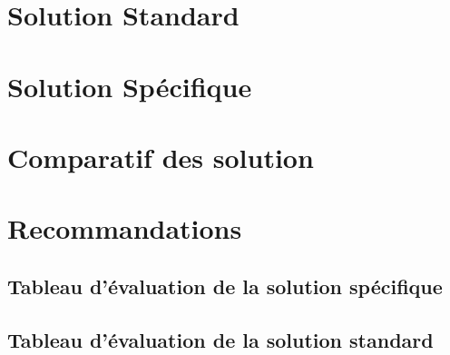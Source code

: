 

\newcommand{\mainTitle}{\'Etude préalable - SPIE}
\newcommand{\secondTitle}{Dossier d'évaluation des solutions}
\newcommand{\documentRef}{DC/4401/1}
\newcommand{\auteurs}{
Lisa \textsc{Courant} \\
Estelle \textsc{Lepeigneux} \\
Pierre \textsc{Jarsaillon} \\
Hugues \textsc{Verlin} \\
}
\newcommand{\chefDeProjet}{Paul \textsc{Dautry}}
\newcommand{\responsableQualite}{Antoine \textsc{Chabert}}




\listoftodos
\newpage

\tableofcontents
\listoffigures
\listoftables
\newpage

\part{Solution Standard}
\setcounter{section}{0}


\part{Solution Spécifique}
\setcounter{section}{0}


\part{Comparatif des solution}
\setcounter{section}{0}


\part{Recommandations}
\setcounter{section}{0}


\appendix

\chapter{Tableau d'évaluation de la solution spécifique}


\chapter{Tableau d'évaluation de la solution standard}




